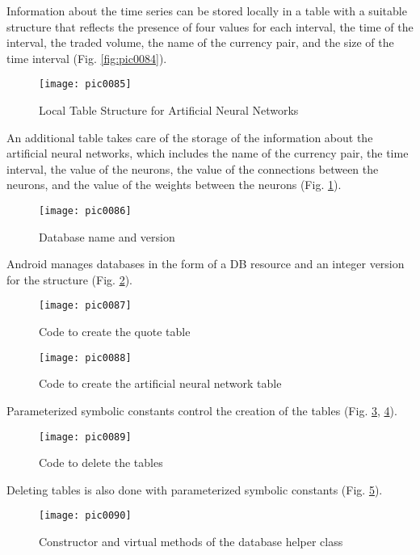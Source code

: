 Information about the time series can be stored locally in a table with a suitable structure that reflects the presence of four values for each interval, the time of the interval, the traded volume, the name of the currency pair, and the size of the time interval (Fig. \ref{fig:pic0084}).

\begin{figure}[h]
\centering
\texttt{[image: pic0085]}
\caption{Local Table Structure for Artificial Neural Networks}
\label{fig:pic0085}
\end{figure}
\FloatBarrier

An additional table takes care of the storage of the information about the artificial neural networks, which includes the name of the currency pair, the time interval, the value of the neurons, the value of the connections between the neurons, and the value of the weights between the neurons (Fig. \ref{fig:pic0085}).

\begin{figure}[h]
\centering
\texttt{[image: pic0086]}
\caption{Database name and version}
\label{fig:pic0086}
\end{figure}
\FloatBarrier

Android manages databases in the form of a DB resource and an integer version for the structure (Fig. \ref{fig:pic0086}).

\begin{figure}[h]
\centering
\texttt{[image: pic0087]}
\caption{Code to create the quote table}
\label{fig:pic0087}
\end{figure}
\FloatBarrier

\begin{figure}[h]
\centering
\texttt{[image: pic0088]}
\caption{Code to create the artificial neural network table}
\label{fig:pic0088}
\end{figure}
\FloatBarrier

Parameterized symbolic constants control the creation of the tables (Fig. \ref{fig:pic0087}, \ref{fig:pic0088}).

\begin{figure}[h]
\centering
\texttt{[image: pic0089]}
\caption{Code to delete the tables}
\label{fig:pic0089}
\end{figure}
\FloatBarrier

Deleting tables is also done with parameterized symbolic constants (Fig. \ref{fig:pic0089}).

\begin{figure}[h]
\centering
\texttt{[image: pic0090]}
\caption{Constructor and virtual methods of the database helper class}
\label{fig:pic0090}
\end{figure}
\FloatBarrier

